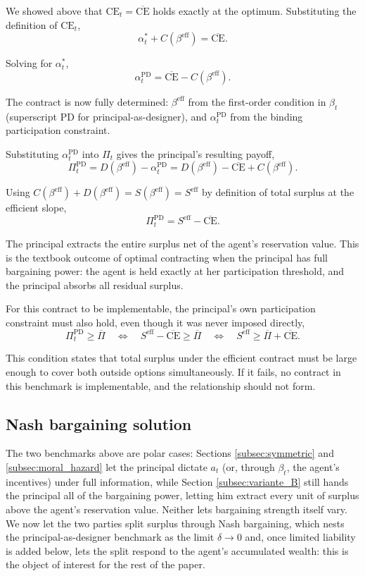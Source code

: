 \documentclass{article}
\theoremstyle{definition}
\theoremstyle{plain}
\begin{document}
We showed above that $\text{CE}_t = \overline{\text{CE}}$ holds exactly at the optimum. Substituting the definition of $\text{CE}_t$,
\[
\alpha_t^* + C(\beta^{\text{eff}}) = \overline{\text{CE}}.
\]

Solving for $\alpha_t^*$,
\[
\alpha_t^{\text{PD}} = \overline{\text{CE}} - C(\beta^{\text{eff}}).
\]

The contract is now fully determined: $\beta^{\text{eff}}$ from the first-order condition in $\beta_t$ (superscript PD for principal-as-designer), and $\alpha_t^{\text{PD}}$ from the binding participation constraint.

Substituting $\alpha_t^{\text{PD}}$ into $\Pi_t$ gives the principal's resulting payoff,
\[
\Pi_t^{\text{PD}} = D(\beta^{\text{eff}}) - \alpha_t^{\text{PD}} = D(\beta^{\text{eff}}) - \overline{\text{CE}} + C(\beta^{\text{eff}}).
\]

Using $C(\beta^{\text{eff}}) + D(\beta^{\text{eff}}) = S(\beta^{\text{eff}}) = S^{\text{eff}}$ by definition of total surplus at the efficient slope,
\[
\Pi_t^{\text{PD}} = S^{\text{eff}} - \overline{\text{CE}}.
\]

The principal extracts the entire surplus net of the agent's reservation value. This is the textbook outcome of optimal contracting when the principal has full bargaining power: the agent is held exactly at her participation threshold, and the principal absorbs all residual surplus.

For this contract to be implementable, the principal's own participation constraint must also hold, even though it was never imposed directly,
\[
\Pi_t^{\text{PD}} \geq \overline{\Pi} \quad \Longleftrightarrow \quad S^{\text{eff}} - \overline{\text{CE}} \geq \overline{\Pi} \quad \Longleftrightarrow \quad S^{\text{eff}} \geq \overline{\Pi} + \overline{\text{CE}}.
\]

This condition states that total surplus under the efficient contract must be large enough to cover both outside options simultaneously. If it fails, no contract in this benchmark is implementable, and the relationship should not form.

\subsection{Nash bargaining solution}\label{subsec:nash}

The two benchmarks above are polar cases: Sections \ref{subsec:symmetric} and \ref{subsec:moral_hazard} let the principal dictate $a_t$ (or, through $\beta_t$, the agent's incentives) under full information, while Section \ref{subsec:variante_B} still hands the principal all of the bargaining power, letting him extract every unit of surplus above the agent's reservation value. Neither lets bargaining strength itself vary. We now let the two parties split surplus through Nash bargaining, which nests the principal-as-designer benchmark as the limit $\delta\to0$ and, once limited liability is added below, lets the split respond to the agent's accumulated wealth: this is the object of interest for the rest of the paper.
\end{document}
